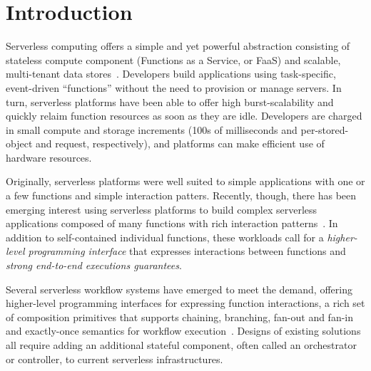 \section{Introduction}

Serverless computing offers a simple and yet powerful abstraction consisting of
stateless compute component (Functions as a Service, or FaaS) and scalable,
multi-tenant data stores~\cite{berkeley}. Developers build applications using
task-specific, event-driven ``functions'' without the need to provision or
manage servers. In turn, serverless platforms have been able to offer high
burst-scalability and quickly relaim function resources as soon as they are
idle. Developers are charged in small compute and storage increments (100s of
milliseconds and per-stored-object and request, respectively), and platforms
can make efficient use of hardware resources.

Originally, serverless platforms were well suited to simple applications with
one or a few functions and simple interaction patters. Recently, though, there
has been emerging interest using serverless platforms to build complex
serverless applications composed of many functions with rich interaction
patterns~\cite{excamera, pywren, gg-atc, beldi, boki}. In addition to
self-contained individual functions, these workloads call for a
\emph{higher-level programming interface} that expresses interactions between
functions and \emph{strong end-to-end executions guarantees}.

Several serverless workflow systems have emerged to meet the demand, offering
higher-level programming interfaces for expressing function interactions, a
rich set of composition primitives that supports chaining, branching, fan-out
and fan-in and exactly-once semantics for workflow execution~\cite{excamera,
gg-atc, aws-step-functions, google-cloud-composer, google-workflows,
durable-functions}. Designs of existing solutions all require adding an
additional stateful component, often called an orchestrator or controller, to
current serverless infrastructures.

